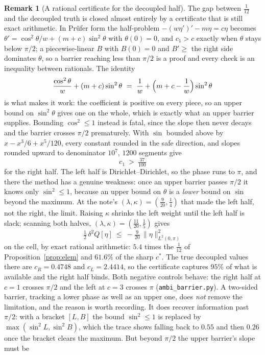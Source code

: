 \documentclass[11pt]{article}
\theoremstyle{definition}
\newtheorem{remark}[theorem]{Remark}
\begin{document}
\begin{remark}[A rational certificate for the decoupled half]\label{rem:barrier}
The gap between $\tfrac1{12}$ and the decoupled truth is closed almost entirely by a
certificate that is still exact arithmetic. In Prüfer form the half-problem
$-(w\eta')'-m\eta=c\eta$ becomes $\theta'=\cos^2\theta/w+(m+c)\sin^2\theta$ with
$\theta(0)=0$, and $c_1>c$ exactly when $\theta$ stays below $\pi/2$; a piecewise-linear
$B$ with $B(0)=0$ and $B'\ge$ the right side dominates $\theta$, so a barrier reaching
less than $\pi/2$ is a proof and every check is an inequality between rationals. The
identity
\[
  \frac{\cos^2\theta}{w}+(m+c)\sin^2\theta
  \ =\ \frac1w+\Bigl(m+c-\frac1w\Bigr)\sin^2\theta
\]
is what makes it work: the coefficient is positive on every piece, so an upper bound on
$\sin^2\theta$ gives one on the whole, which is exactly what an upper barrier supplies.
Bounding $\cos^2\le1$ instead is fatal, since the slope then never decays and the barrier
crosses $\pi/2$ prematurely. With $\sin$ bounded above by $x-x^3/6+x^5/120$, every
constant rounded in the safe direction, and slopes rounded upward to denominator $10^7$,
$1200$ segments give
\[
  c_1\ >\ \tfrac{37}{100}
\]
for the right half. The left half is Dirichlet--Dirichlet, so the phase runs to $\pi$,
and there the method has a genuine weakness: once an upper barrier passes $\pi/2$ it knows
only $\sin^2\le1$, because an upper bound on $\theta$ is a \emph{lower} bound on $\sin$
beyond the maximum. At the note's $(\lambda,\kappa)=(\tfrac9{20},\tfrac14)$ that made the
left half, not the right, the limit. Raising $\kappa$ shrinks the left weight until the
left half is slack; scanning both halves, $(\lambda,\kappa)=(\tfrac{11}{20},\tfrac15)$
gives
\[
  \tfrac12\,\delta^2Q[\eta]\ \le\ -\tfrac9{20}\,\|\eta\|^2_{L^2(0,\pi)}
\]
on the cell, by exact rational arithmetic: $5.4$ times the $\tfrac1{12}$ of
Proposition~\ref{prop:elem} and $61.6\%$ of the sharp $c^\ast$. The true decoupled values
there are $c_R=0.4748$ and $c_L=2.4414$, so the certificate captures $95\%$ of what is
available and the right half binds. Both negative controls behave: the right half at
$c=1$ crosses $\pi/2$ and the left at $c=3$ crosses $\pi$ (\verb|ambi_barrier.py|). A
two-sided barrier, tracking a lower phase as well as an upper one, does \emph{not} remove
the limitation, and the reason is worth recording. It does recover information past
$\pi/2$: with a bracket $[L,B]$ the bound $\sin^2\le1$ is replaced by
$\max(\sin^2L,\sin^2B)$, which the trace shows falling back to $0.55$ and then $0.26$ once
the bracket clears the maximum. But beyond $\pi/2$ the upper barrier's slope must be

\end{remark}
\end{document}
